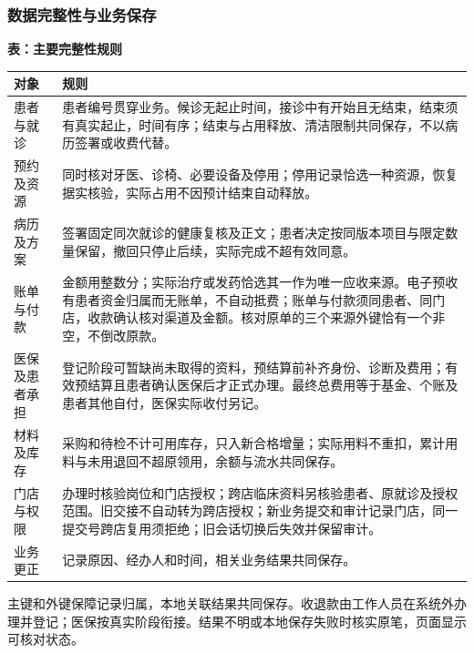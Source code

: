 \documentclass[UTF8,a4paper,zihao=-4,fontset=none]{ctexart}
\begin{document}
\subsubsection{数据完整性与业务保存}
{\small\setlength{\tabcolsep}{3pt}\renewcommand{\arraystretch}{1.02}
\noindent\textbf{表\thetable：主要完整性规则}\par\smallskip
\noindent\begin{tabular}{@{}>{\raggedright\arraybackslash}p{2.944cm}>{\raggedright\arraybackslash}p{12.756cm}@{}}
\toprule
对象 & 规则 \\ \midrule
患者与就诊 & 患者编号贯穿业务。候诊无起止时间，接诊中有开始且无结束，结束须有真实起止，时间有序；结束与占用释放、清洁限制共同保存，不以病历签署或收费代替。 \\
预约及资源 & 同时核对牙医、诊椅、必要设备及停用；停用记录恰选一种资源，恢复据实核验，实际占用不因预计结束自动释放。 \\
病历及方案 & 签署固定同次就诊的健康复核及正文；患者决定按同版本项目与限定数量保留，撤回只停止后续，实际完成不超有效同意。 \\
账单与付款 & 金额用整数分；实际治疗或发药恰选其一作为唯一应收来源。电子预收有患者资金归属而无账单，不自动抵费；账单与付款须同患者、同门店，收款确认核对渠道及金额。核对原单的三个来源外键恰有一个非空，不倒改原款。 \\
医保及患者承担 & 登记阶段可暂缺尚未取得的资料，预结算前补齐身份、诊断及费用；有效预结算且患者确认医保后才正式办理。最终总费用等于基金、个账及患者其他自付，医保实际收付另记。 \\
材料及库存 & 采购和待检不计可用库存，只入新合格增量；实际用料不重扣，累计用料与未用退回不超原领用，余额与流水共同保存。 \\
门店与权限 & 办理时核验岗位和门店授权；跨店临床资料另核验患者、原就诊及授权范围。旧交接不自动转为跨店授权；新业务提交和审计记录门店，同一提交号跨店复用须拒绝；旧会话切换后失效并保留审计。 \\
业务更正 & 记录原因、经办人和时间，相关业务结果共同保存。 \\
\bottomrule
\end{tabular}\par}
\medskip
主键和外键保障记录归属，本地关联结果共同保存。收退款由工作人员在系统外办理并登记；医保按真实阶段衔接。结果不明或本地保存失败时核实原笔，页面显示可核对状态。\par

\medskip
\end{document}
